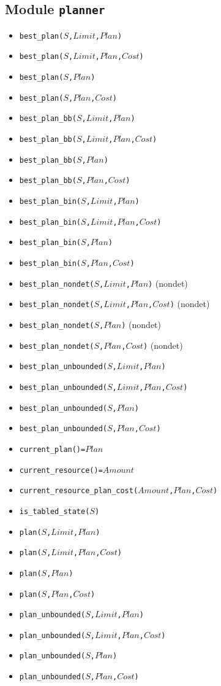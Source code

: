 \documentclass[10pt]{article}
\begin{document}
\begin{multicols}{2}
\section*{Module \texttt{planner}}  
\begin{scriptsize}
\begin{itemize}
\item \texttt{best\_plan($S$,$Limit$,$Plan$)}
\item \texttt{best\_plan($S$,$Limit$,$Plan$,$Cost$)}
\item \texttt{best\_plan($S$,$Plan$)}
\item \texttt{best\_plan($S$,$Plan$,$Cost$)}
\item \texttt{best\_plan\_bb($S$,$Limit$,$Plan$)}
\item \texttt{best\_plan\_bb($S$,$Limit$,$Plan$,$Cost$)}
\item \texttt{best\_plan\_bb($S$,$Plan$)}
\item \texttt{best\_plan\_bb($S$,$Plan$,$Cost$)}
\item \texttt{best\_plan\_bin($S$,$Limit$,$Plan$)}
\item \texttt{best\_plan\_bin($S$,$Limit$,$Plan$,$Cost$)}
\item \texttt{best\_plan\_bin($S$,$Plan$)}
\item \texttt{best\_plan\_bin($S$,$Plan$,$Cost$)}
\item \texttt{best\_plan\_nondet($S$,$Limit$,$Plan$)} (nondet)
\item \texttt{best\_plan\_nondet($S$,$Limit$,$Plan$,$Cost$)} (nondet)
\item \texttt{best\_plan\_nondet($S$,$Plan$)} (nondet)
\item \texttt{best\_plan\_nondet($S$,$Plan$,$Cost$)} (nondet)
\item \texttt{best\_plan\_unbounded($S$,$Limit$,$Plan$)}
\item \texttt{best\_plan\_unbounded($S$,$Limit$,$Plan$,$Cost$)}
\item \texttt{best\_plan\_unbounded($S$,$Plan$)}
\item \texttt{best\_plan\_unbounded($S$,$Plan$,$Cost$)}
\item \texttt{current\_plan()=$Plan$}
\item \texttt{current\_resource()=$Amount$}
\item \texttt{current\_resource\_plan\_cost($Amount$,$Plan$,$Cost$)}
\item \texttt{is\_tabled\_state($S$)}
\item \texttt{plan($S$,$Limit$,$Plan$)}
\item \texttt{plan($S$,$Limit$,$Plan$,$Cost$)}
\item \texttt{plan($S$,$Plan$)}
\item \texttt{plan($S$,$Plan$,$Cost$)}
\item \texttt{plan\_unbounded($S$,$Limit$,$Plan$)}
\item \texttt{plan\_unbounded($S$,$Limit$,$Plan$,$Cost$)}
\item \texttt{plan\_unbounded($S$,$Plan$)}
\item \texttt{plan\_unbounded($S$,$Plan$,$Cost$)}
\end{itemize}
\end{scriptsize}

\end{multicols}
\end{document}
